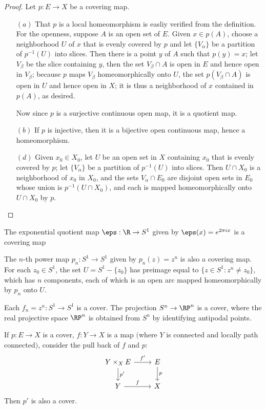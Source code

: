 \begin{proof}
Let $p:E\to X$ be a covering map.
\begin{itemize}
\item[$(a)$]That $p$ is a local homeomorphism is easliy verified from the definition. For the openness, suppose $A$ is an open set of $E$. Given $x\in p(A)$, choose a neighborhood $U$ of $x$ that is evenly covered by $p$ and let $\{V_\alpha\}$ be a partition of $p^{-1}(U)$ into slices. Then there is a point $y$ of $A$ such that $p(y)=x$; let $V_\beta$ be the slice containing $y$, then the set $V_\beta\cap A$ is open in $E$ and hence open in $V_\beta$; because $p$ maps $V_\beta$ homeomorphically onto $U$, the set $p(V_\beta\cap A)$ is open in $U$ and hence open in $X$; it is thus a neighborhood of $x$ contained in $p(A)$, as desired.\par 
Now since $p$ is a surjective continuous open map, it is a quotient map.
\item[$(b)$]If $p$ is injective, then it is a bijective open continuous map, hence a homeomorphism.
\item[$(d)$]Given $x_0\in X_0$, let $U$ be an open set in $X$ containing $x_0$ that is evenly covered by $p$; let $\{V_\alpha\}$ be a partition of $p^{-1}(U)$ into slices. 
Then $U\cap X_0$ is a neighborhood of $x_0$ in $X_0$, and the sets $V_\alpha\cap E_0$ are disjoint open sets in $E_0$ whose union is $p^{-1}(U\cap X_0)$, and each is 
mapped homeomorphically onto $U\cap X_0$ by $p$.
\end{itemize} 
\end{proof}
\begin{example}
The exponential quotient map $\eps:\R\to S^1$ given by $\eps(x)=e^{2\pi ix}$ is a covering map
\end{example}
\begin{example}
The $n$-th power map $p_n:S^1\to S^1$ given by $p_n(z)=z^n$ is also a covering map. For 
each $z_0\in S^1$, the set $U=S^1-\{z_0\}$ has preimage equal to $\{z\in S^1:z^n\neq z_0\}$, which 
has $n$ components, each of which is an open arc mapped homeomorphically by $p_n$ onto $U$.
\end{example}
\begin{example}
Each $f_n=z^n:S^1\to S^1$ is a cover. The projection $S^n\to\RP^n$ is a cover, where the real projective space $\RP^n$ is obtained from $S^n$ by identifying antipodal 
points.
\end{example}
\begin{example}
If $p:E\to X$ is a cover, $f:Y\to X$ is a map $($where $Y$ is connected and locally path connected$)$, consider the pull back of $f$ and $p$:
\[\begin{tikzcd}
Y\times_{X}E\ar[d,"p'"]\ar[r,"f'"]&E\ar[d,"p"]\\
Y\ar[r,"f"]&X
\end{tikzcd}\]
Then $p'$ is also a cover.
\end{example}
